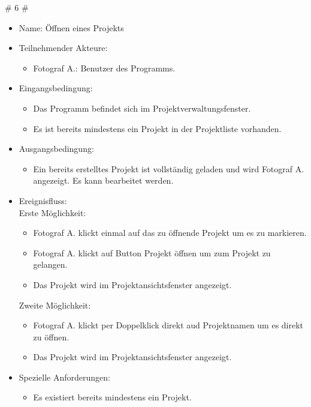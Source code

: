 		\# 6 \#
		\begin{itemize}
			\item Name: Öffnen eines Projekts
			\item Teilnehmender Akteure:
			\begin{itemize}
				\item	Fotograf A.: Benutzer des Programms.		
			\end{itemize}
			\item Eingangsbedingung:
			\begin{itemize}
				\item	Das Programm befindet sich im Projektverwaltungsfenster.
				\item Es ist bereits mindestens ein Projekt in der Projektliste vorhanden.
			\end{itemize}
			\item Ausgangsbedingung:
			\begin{itemize}
				\item	Ein bereits erstelltes Projekt ist vollständig geladen und wird Fotograf A. angezeigt. Es kann bearbeitet werden.		
			\end{itemize}
			\item Ereignisfluss:\\Erste Möglichkeit:
			\begin{itemize}
				\item Fotograf A. klickt einmal auf das zu öffnende Projekt um es zu markieren.
				\item Fotograf A. klickt auf Button Projekt öffnen um zum Projekt zu gelangen.
				\item Das Projekt wird im Projektansichtsfenster angezeigt.
			\end{itemize}
			Zweite Möglichkeit:
			\begin{itemize}
				\item Fotograf A. klickt per Doppelklick direkt aud Projektnamen um es direkt zu öffnen.
				\item Das Projekt wird im Projektansichtsfenster angezeigt.					
			\end{itemize}
			\item Spezielle Anforderungen:
			\begin{itemize}
				\item	Es existiert bereits mindestens ein Projekt.	
			\end{itemize}			
		\end{itemize}
		
